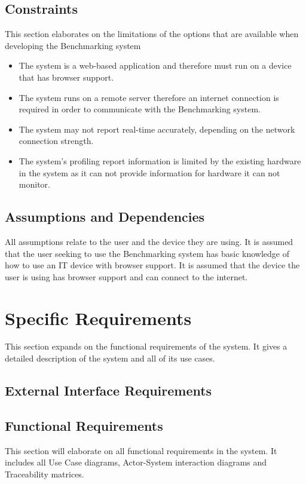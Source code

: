 \documentclass{article}
\begin{document}
	\subsection{Constraints}
    This section elaborates on the limitations of the options that are available when developing the Benchmarking system 
    \begin{itemize}
    	\item The system is a web-based application and therefore must run on a device that has browser support. 
        \item The system runs on a remote server therefore an internet connection is required in order to communicate with the Benchmarking system. 
        \item The system may not report real-time accurately, depending on the network connection strength.
        \item The system's profiling report information is limited by the existing hardware in the system as it can not provide information for hardware it can not monitor.
    \end{itemize}
	\subsection{Assumptions and Dependencies}
	All assumptions relate to the user and the device they are using. It is assumed that the user seeking to use the Benchmarking system has basic knowledge of how to use an IT device with browser support. It is assumed that the device the user is using has browser support and can connect to the internet.   
	\section{Specific Requirements}
	This section expands on the functional requirements of the system. It gives a detailed 	description of the system and all of its use cases.
	
	\subsection{External Interface Requirements}
	
	\subsection{Functional Requirements}
	This section will elaborate on all functional requirements in the system. It includes all Use Case diagrams, Actor-System interaction diagrams and Traceability matrices.	
	
\end{document}
